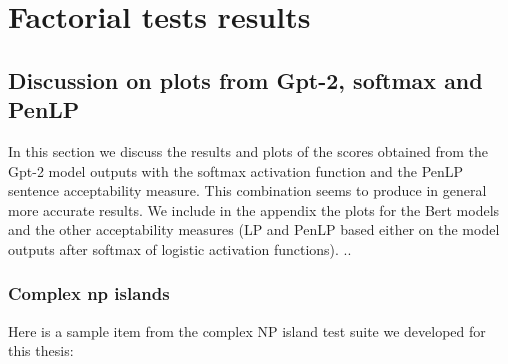 \section{Factorial tests results}



\subsection{Discussion on plots from Gpt-2, softmax and PenLP}

In this section we discuss the results and plots of the scores obtained from the Gpt-2 model outputs with the softmax activation function and the PenLP sentence acceptability measure. This combination seems to produce in general more accurate results. We include in the appendix the plots for the Bert models and the other acceptability measures (LP and PenLP based either on the model outputs after softmax of logistic activation functions).
..


\subsubsection{Complex np islands}

Here is a sample item from the complex NP island test suite we developed for this thesis:


